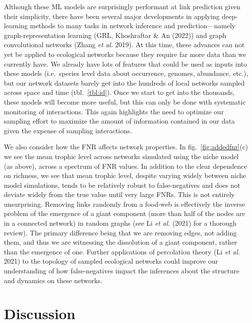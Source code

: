 \documentclass[10pt,oneside]{article}
\begin{document}
Although these ML models are surprisingly performant at link prediction
given their simplicity, there have been several major developments in
applying deep-learning methods to many tasks in network inference and
prediction---namely graph-representation learning (GRL, Khoshraftar \&
An (2022)) and graph convolutional networks (Zhang \emph{et al.} 2019).
At this time, these advances can not yet be applied to ecological
networks because they require far more data than we currently have. We
already have lots of features that could be used as inputs into these
models (i.e.~species level data about occurrence, genomes, abundance,
etc.), but our network datasets barely get into the hundreds of local
networks sampled across space and time (tbl.~\ref{tbl:id}). Once we
start to get into the thousands, these models will become more useful,
but this can only be done with systematic monitoring of interactions.
This again highlights the need to optimize our sampling effort to
maximize the amount of information contained in our data given the
expense of sampling interactions.

We also consider how the FNR affects network properties. In
fig.~\ref{fig:addedfnr}(c) we see the mean trophic level across networks
simulated using the niche model (as above), across a spectrum of FNR
values. In addition to the clear dependence on richness, we see that
mean trophic level, despite varying widely between niche model
simulations, tends to be relatively robust to false-negatives and does
not deviate widely from the true value until very large FNRs. This is
not entirely unsurprising. Removing links randomly from a food-web is
effectively the inverse problem of the emergence of a giant component
(more than half of the nodes are in a connected network) in random
graphs (see Li \emph{et al.} (2021) for a thorough review). The primary
difference being that we are removing edges, not adding them, and thus
we are witnessing the dissolution of a giant component, rather than the
emergence of one. Further applications of percolation theory (Li
\emph{et al.} 2021) to the topology of sampled ecological networks could
improve our understanding of how false-negatives impact the inferences
about the structure and dynamics on these networks.

\hypertarget{discussion}{%
\section{Discussion}\label{discussion}}
\end{document}
